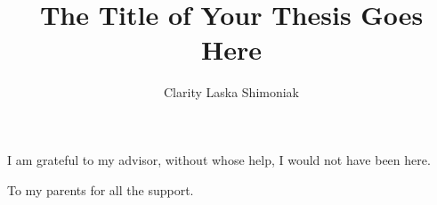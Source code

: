 \documentclass[oneside,final, letterpaper]{ucr}
\begin{document}

\title{The Title of Your Thesis Goes Here}
\author{Clarity Laska Shimoniak}

\maketitle
\copyrightpage{}
\approvalpage{}


\begin{frontmatter}

\begin{acknowledgements}
I am grateful to my advisor, without whose help, I would not have been here.
\end{acknowledgements}

\begin{dedication}
\null\vfil
{\large
\begin{center}
To my parents for all the support.
\end{center}}
\vfil\null
\end{dedication}



\tableofcontents
\listoffigures
\listoftables
\end{frontmatter}










\nocite{*}
% 




\end{document}
